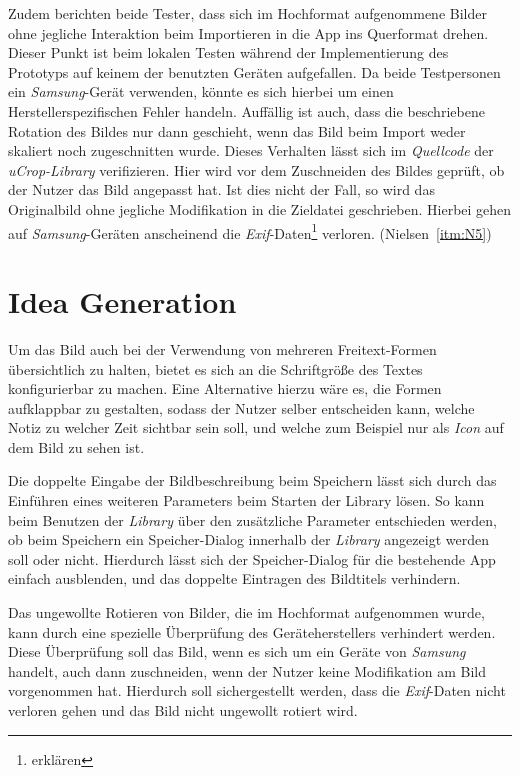 Zudem berichten beide Tester, dass sich im Hochformat aufgenommene Bilder ohne jegliche Interaktion beim Importieren in die App ins Querformat drehen.
Dieser Punkt ist beim lokalen Testen während der Implementierung des Prototyps auf keinem der benutzten Geräten aufgefallen.
Da beide Testpersonen ein \emph{Samsung}-Gerät verwenden, könnte es sich hierbei um einen Herstellerspezifischen Fehler handeln.
Auffällig ist auch, dass die beschriebene Rotation des Bildes nur dann geschieht, wenn das Bild beim Import weder skaliert noch zugeschnitten wurde.
Dieses Verhalten lässt sich im \emph{Quellcode} der \emph{uCrop-Library} verifizieren.
Hier wird vor dem Zuschneiden des Bildes geprüft, ob der Nutzer das Bild angepasst hat.
Ist dies nicht der Fall, so wird das Originalbild ohne jegliche Modifikation in die Zieldatei geschrieben.
Hierbei gehen auf \emph{Samsung}-Geräten anscheinend die \emph{Exif}-Daten\footnote{erklären} verloren.
(Nielsen~\autoref{itm:N5}) \\ 

\section{Idea Generation}\label{sec:idea4}
Um das Bild auch bei der Verwendung von mehreren Freitext-Formen übersichtlich zu halten, bietet es sich an die Schriftgröße des Textes konfigurierbar zu machen.
Eine Alternative hierzu wäre es, die Formen aufklappbar zu gestalten, sodass der Nutzer selber entscheiden kann, welche Notiz zu welcher Zeit sichtbar sein soll, und welche zum Beispiel nur als \emph{Icon} auf dem Bild zu sehen ist. \\

Die doppelte Eingabe der Bildbeschreibung beim Speichern lässt sich durch das Einführen eines weiteren Parameters beim Starten der Library lösen.
So kann beim Benutzen der \emph{Library} über den zusätzliche Parameter entschieden werden, ob beim Speichern ein Speicher-Dialog innerhalb der \emph{Library} angezeigt werden soll oder nicht.
Hierdurch lässt sich der Speicher-Dialog für die bestehende App einfach ausblenden, und das doppelte Eintragen des Bildtitels verhindern.

Das ungewollte Rotieren von Bilder, die im Hochformat aufgenommen wurde, kann durch eine spezielle Überprüfung des Geräteherstellers verhindert werden.
Diese Überprüfung soll das Bild, wenn es sich um ein Geräte von \emph{Samsung} handelt, auch dann zuschneiden, wenn der Nutzer keine Modifikation am Bild vorgenommen hat.
Hierdurch soll sichergestellt werden, dass die \emph{Exif}-Daten nicht verloren gehen und das Bild nicht ungewollt rotiert wird.

